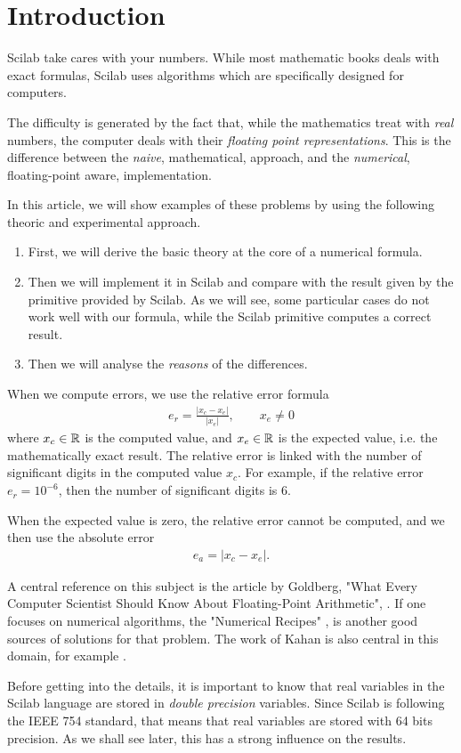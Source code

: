 \section{Introduction}

Scilab take cares with your numbers.
While most mathematic books deals with exact formulas, 
Scilab uses algorithms which are specifically designed for 
computers. 

The difficulty is generated by the fact that, while 
the mathematics treat with \emph{real} numbers, the 
computer deals with their \emph{floating point representations}.
This is the difference between the 
\emph{naive}, mathematical, approach, and the \emph{numerical},
floating-point aware, implementation.

In this article, we will show examples of these problems by 
using the following theoric and experimental approach.
\begin{enumerate}
\item First, we will derive the basic theory at the core of a numerical
formula. 
\item Then we will implement it in Scilab and compare with the 
result given by the primitive provided by Scilab.
As we will see, some particular cases do not work well
with our formula, while the Scilab primitive computes a correct
result.
\item Then we will analyse the \emph{reasons} of the differences.
\end{enumerate}

When we compute errors, we use the relative error formula
\begin{eqnarray}
e_r=\frac{|x_c-x_e|}{|x_e|}, \qquad x_e\neq 0
\end{eqnarray}
where $x_c\in\mathbb{R}$ is the computed value, and $x_e\in\mathbb{R}$ is the 
expected value, i.e. the mathematically exact result.
The relative error is linked with the number of significant 
digits in the computed value $x_c$. For example, if the relative 
error $e_r=10^{-6}$, then the number of significant digits is 6.

When the expected value is zero, the relative error cannot 
be computed, and we then use the absolute error 
\begin{eqnarray}
e_a=|x_c-x_e|.
\end{eqnarray}

A central reference on this subject is the article 
by Goldberg, "What Every Computer Scientist Should Know About Floating-Point Arithmetic", 
\cite{WhatEveryComputerScientist}.
If one focuses on numerical algorithms, the "Numerical Recipes" \cite{NumericalRecipes},
is another good sources of solutions for that problem.
The work of Kahan is also central in this domain, for example \cite{Kahan2004}.

Before getting into the details, it is important to 
know that real variables in the Scilab language are stored in 
\emph{double precision} variables. Since Scilab is 
following the IEEE 754 standard, that means that real 
variables are stored with 64 bits precision.
As we shall see later, this has a strong influence on the 
results.

